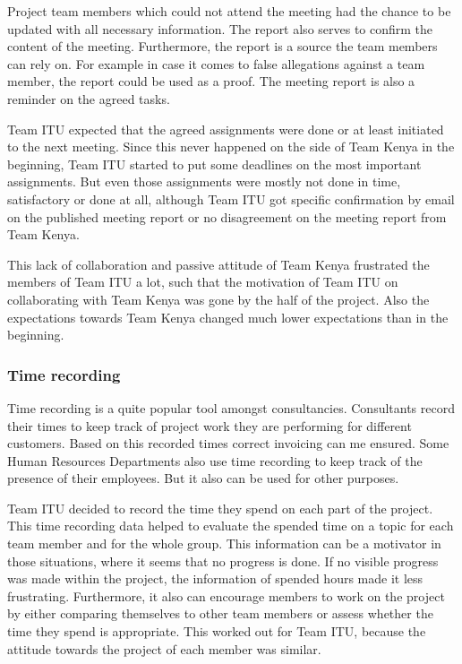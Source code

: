 Project team members which could not attend the meeting had the chance to be updated with all necessary information. The report also serves to confirm the content of the meeting. Furthermore, the report is a source the team members can rely on. For example in case it comes to false allegations against a team member, the report could be used as a proof. The meeting report is also a reminder on the agreed tasks.

Team ITU expected that the agreed assignments were done or at least initiated to the next meeting. Since this never happened on the side of Team Kenya in the beginning, Team ITU started to put some deadlines on the most important assignments. But even those assignments were mostly not done in time, satisfactory or done at all, although Team ITU got specific confirmation by email on the published meeting report or no disagreement on the meeting report from Team Kenya.

This lack of collaboration and passive attitude of Team Kenya frustrated the members of Team ITU a lot, such that the motivation of Team ITU on collaborating with Team Kenya was gone by the half of the project. Also the expectations towards Team Kenya changed much lower expectations than in the beginning.

\subsubsection {Time recording}
Time recording is a quite popular tool amongst consultancies. Consultants record their times to keep track of project work they are performing for different customers. Based on this recorded times correct invoicing can me ensured. Some Human Resources Departments also use time recording to keep track of the presence of their employees. But it also can be used for other purposes.

Team ITU decided to record the time they spend on each part of the project. This time recording data helped to evaluate the spended time on a topic for each team member and for the whole group. This information can be a motivator in those situations, where it seems that no progress is done. If no visible progress was made within the project, the information of spended hours made it less frustrating. Furthermore, it also can encourage members to work on the project by either comparing themselves to other team members or assess whether the time they spend is appropriate. This worked out for Team ITU, because the attitude towards the project of each member was similar.


